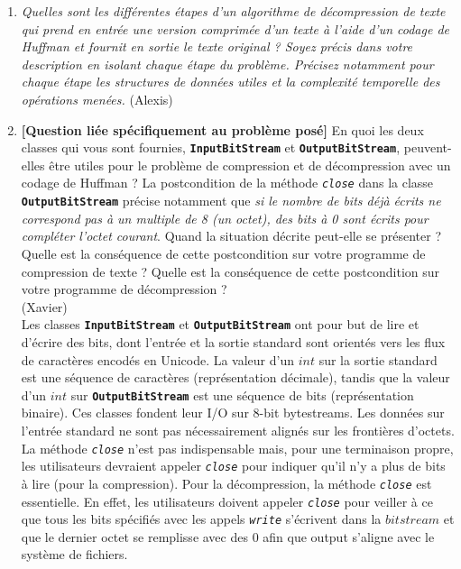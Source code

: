 \documentclass[11pt]{article}
\begin{document}
\begin{enumerate}
\item \textit{Quelles sont les différentes étapes d'un algorithme de décompression de texte qui prend en entrée une version comprimée d'un texte à l'aide d'un codage de Huffman et fournit en sortie le texte original ? Soyez précis dans votre description en isolant chaque étape du problème. Précisez notamment pour chaque étape les structures de données utiles et la complexité temporelle des opérations menées.} (Alexis)\\

\item \textbf{[Question liée spécifiquement au problème posé]} En quoi les deux classes qui
vous sont fournies, \texttt{\textbf{InputBitStream}} et \texttt{\textbf{OutputBitStream}}, peuvent-elles
être utiles pour le problème de compression et de décompression avec un codage
de Huffman ? La postcondition de la méthode \texttt{\textit{close}} dans la classe \texttt{\textbf{OutputBitStream}}
précise notamment que \textit{si le nombre de bits déjà écrits ne correspond pas à un
multiple de 8 (un octet), des bits à 0 sont écrits pour compléter l’octet courant}.
Quand la situation décrite peut-elle se présenter ? Quelle est la conséquence de
cette postcondition sur votre programme de compression de texte ? Quelle est la
conséquence de cette postcondition sur votre programme de décompression ? \\(Xavier)\\
Les classes \texttt{\textbf{InputBitStream}} et \texttt{\textbf{OutputBitStream}} ont pour but de lire et d'écrire des bits, dont l'entrée et la sortie standard sont orientés vers les flux de caractères encodés en Unicode. La valeur d'un $int$ sur la sortie standard est une séquence de caractères (représentation décimale), tandis que la valeur d'un $int$ sur \texttt{\textbf{OutputBitStream}} est une séquence de bits (représentation binaire). Ces classes  fondent leur I/O sur 8-bit bytestreams. Les données sur l'entrée standard ne sont pas nécessairement alignés sur les frontières d'octets. La méthode \texttt{\textit{close}} n'est pas indispensable mais, pour une terminaison propre, les utilisateurs devraient appeler \texttt{\textit{close}} pour indiquer qu'il n'y a plus de bits à lire (pour la compression). Pour la décompression, la méthode \texttt{\textit{close}} est essentielle. En effet, les utilisateurs doivent appeler \texttt{\textit{close}} pour veiller à ce que tous les bits spécifiés avec les appels \texttt{\textit{write}} s'écrivent dans la $bitstream$ et que le dernier octet se remplisse avec des 0 afin que output s'aligne avec le système de fichiers.

\end{enumerate}
\end{document}
